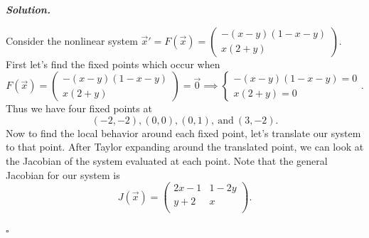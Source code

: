 \documentclass[12pt]{report}
\newenvironment{solution}[1][\it{Solution}]{\textbf{#1. } }{$\square$}
\begin{document}
\begin{solution}

    \noindent
    Consider the nonlinear system $\vec{x}' = F(\vec{x}) = \begin{pmatrix}
        -(x-y)(1 -x-y)\\
        x(2 +y)
    \end{pmatrix}$. First let's find the fixed points which occur when 
    \[
        F(\vec{x}) = \begin{pmatrix}
            -(x-y)(1 -x-y)\\
            x(2 +y)
        \end{pmatrix} = \vec{0} \implies \begin{cases}
            -(x-y)(1 -x-y) = 0\\
            x(2 +y) = 0
        \end{cases}.
    \] 
    Thus we have four fixed points at
    \[ 
        (-2,-2), (0,0), (0,1), ~ \text{and} ~(3,-2).
    \]
    Now to find the local behavior around each fixed point, let's translate our system to that point. After Taylor expanding around the translated point, we can look at the Jacobian of the system evaluated at each point. Note that the general Jacobian for our system is
    \[ 
       J(\vec{x}) = \left(
        \begin{array}{cc}
        2 x-1 & 1-2 y \\
        y+2 & x \\
        \end{array}
        \right).    
    \]


\end{solution}
\end{document}
